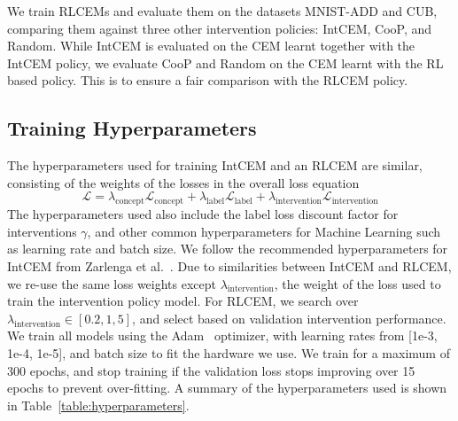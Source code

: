 We train RLCEMs and evaluate them on the datasets MNIST-ADD and CUB, 
comparing them against three other intervention policies:
IntCEM, CooP, and Random. While IntCEM is evaluated on the
CEM learnt together with the IntCEM policy,
we evaluate CooP and Random on the CEM learnt 
with the RL based policy. This is to ensure a fair comparison
with the RLCEM policy.

\subsection{Training Hyperparameters}

The hyperparameters used for training IntCEM and an RLCEM are similar,
consisting of the weights of the losses in the overall loss equation
\[\mathcal{L} = \lambda_{\text{concept}} \mathcal{L}_{\text{concept}}
+  \lambda_{\text{label}} \mathcal{L}_{\text{label}}
+  \lambda_{\text{intervention}} \mathcal{L}_{\text{intervention}}\]
The hyperparameters used also include
the label loss discount factor for interventions $\gamma$,
and other common hyperparameters for Machine Learning such as learning rate
and batch size.
We follow the recommended hyperparameters 
for IntCEM from Zarlenga et al.~\cite{intcem}. 
Due 
to similarities between IntCEM and RLCEM, we re-use
the same loss weights except $\lambda_{\text{intervention}}$,
the weight of the loss used to train the intervention policy model.
For RLCEM, we search over $\lambda_{\text{intervention}} \in [0.2, 1, 5]$, and select based on validation
intervention performance.
We train all models using the Adam~\cite{adam} optimizer, with learning rates
from [1e-3, 1e-4, 1e-5], and 
batch size to fit the hardware we use.
We train for a maximum of 300 epochs,
and stop training if the validation loss stops improving over 15 epochs
to prevent over-fitting.
A summary of the hyperparameters used is shown in 
Table~\ref{table:hyperparameters}.

